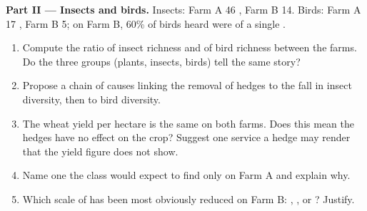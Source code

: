 \begin{problem}
\medskip
\noindent\textbf{Part II --- Insects and birds.}
Insects: Farm A 46 , Farm B 14. Birds: Farm A 17 , Farm B
5; on Farm B, 60\% of birds heard were of a single .
\begin{enumerate}[resume]
  \item Compute the ratio of insect richness and of bird richness
        between the farms. Do the three groups (plants, insects,
        birds) tell the same story?
  \item Propose a chain of causes linking the removal of hedges to the
        fall in insect diversity, then to bird diversity.
  \item The wheat yield per hectare is the same on both farms. Does
        this mean the hedges have no effect on the crop? Suggest one
        service a hedge may render that the yield figure does not
        show.
  \item Name one  the class would expect to find only on Farm A
        and explain why.
  \item Which scale of  has been most obviously reduced on
        Farm B: , , or ? Justify.
\end{enumerate}


\end{problem}
